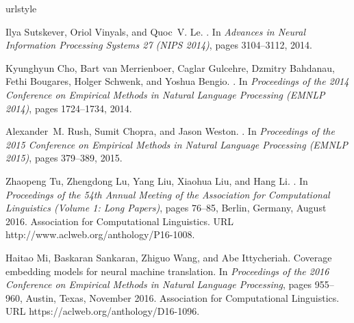 \documentclass[11pt]{article}
\begin{document}

%

\begin{thebibliography}{23}
\providecommand{\natexlab}[1]{#1}
\providecommand{\url}[1]{{#1}}
\expandafter\ifx\csname urlstyle\endcsname\relax
  \providecommand{\doi}[1]{doi: #1}\else
  \providecommand{\doi}{doi: \begingroup \urlstyle{rm}\Url}\fi

Ilya Sutskever, Oriol Vinyals, and Quoc~V. Le.
.
\newblock In \emph{Advances in Neural Information Processing Systems 27 (NIPS
  2014)}, pages 3104--3112, 2014.

Kyunghyun Cho, Bart van Merrienboer, Caglar Gulcehre, Dzmitry Bahdanau, Fethi
  Bougares, Holger Schwenk, and Yoshua Bengio.
.
\newblock In \emph{Proceedings of the 2014 Conference on Empirical Methods in
  Natural Language Processing (EMNLP 2014)}, pages 1724--1734, 2014.

Alexander~M. Rush, Sumit Chopra, and Jason Weston.
.
\newblock In \emph{Proceedings of the 2015 Conference on Empirical Methods in
  Natural Language Processing (EMNLP 2015)}, pages 379--389, 2015.

Zhaopeng Tu, Zhengdong Lu, Yang Liu, Xiaohua Liu, and Hang Li.
.
\newblock In \emph{Proceedings of the 54th Annual Meeting of the Association
  for Computational Linguistics (Volume 1: Long Papers)}, pages 76--85, Berlin,
  Germany, August 2016. Association for Computational Linguistics.
\newblock URL \url{http://www.aclweb.org/anthology/P16-1008}.

Haitao Mi, Baskaran Sankaran, Zhiguo Wang, and Abe Ittycheriah.
\newblock Coverage embedding models for neural machine translation.
\newblock In \emph{Proceedings of the 2016 Conference on Empirical Methods in
  Natural Language Processing}, pages 955--960, Austin, Texas, November 2016.
  Association for Computational Linguistics.
\newblock URL \url{https://aclweb.org/anthology/D16-1096}.


\end{thebibliography}
\end{document}
